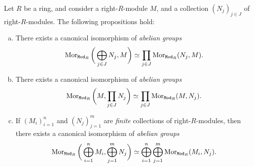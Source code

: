 \begin{proposition}
    \label{prop:direct-sums-isos-hom-sets}
    Let \(R\) be a ring, and consider a right-\(R\)-module \(M\), and a collection
    \((N_j)_{j \in J}\) of right-\(R\)-modules. The following propositions hold:
    \begin{enumerate}[(a)]\setlength\itemsep{0em}
        \item There exists a canonical isomorphism of \emph{abelian groups}
              \[
                  \operatorname{Mor}_{{\texttt{Mod}_{R}}}\bigg( \bigoplus_{j \in J} N_j, M \bigg) \simeq
                  \prod_{j \in J} \operatorname{Mor}_{{\texttt{Mod}_{R}}}(N_j, M).
              \]

        \item There exists a canonical isomorphism of \emph{abelian groups}
              \[
                  \operatorname{Mor}_{{\texttt{Mod}_{R}}}\bigg( M, \prod_{j \in J} N_j \bigg) \simeq
                  \prod_{j \in J} \operatorname{Mor}_{{\texttt{Mod}_{R}}}(M, N_j).
              \]
        \item If \((M_i)_{i = 1}^n\) and \((N_j)_{j=1}^m\) are \emph{finite} collections
              of right-\(R\)-modules, then there exists a canonical isomorphism of
              \emph{abelian groups}
              \[
                  \operatorname{Mor}_{{\texttt{Mod}_{R}}} \bigg( \bigoplus_{i=1}^n M_i, \bigoplus_{j=1}^m N_j \bigg)
                  \simeq
                  \bigoplus_{i=1}^n \bigoplus_{j=1}^m \operatorname{Mor}_{{\texttt{Mod}_{R}}}(M_i, N_j).
              \]
    \end{enumerate}
\end{proposition}

